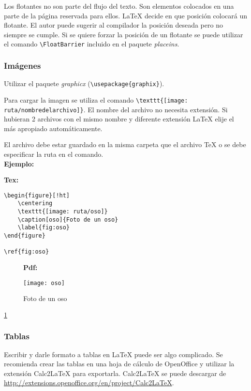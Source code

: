 \documentclass[12pt, a4paper,twoside]{article} %
\begin{document}
Los flotantes no son parte del flujo del texto. Son elementos colocados en una parte de la página reservada para ellos. LaTeX decide en que posición colocará un flotante. El autor puede sugerir al compilador la posición deseada pero no siempre se cumple. Si se quiere forzar la posición de un flotante se puede utilizar el comando \lstinline&\FloatBarrier& incluido en el paquete \emph{placeins}.

\subsubsection{Imágenes}

Utilizar el paquete \emph{graphicx} (\lstinline$\usepackage{graphix}$).

Para cargar la imagen se utiliza el comando \lstinline$\texttt{[image: ruta/nombredelarchivo]}$. El nombre del
archivo no necesita extensión. Si hubieran 2 archivos con el mismo nombre y diferente extensión LaTeX elije el más apropiado automáticamente. 

El archivo debe estar guardado en la misma carpeta que el archivo TeX o se debe especificar la ruta en el comando.\\

\noindent\textbf{Ejemplo:}

\textbf{Tex:}

\begin{lstlisting}
\begin{figure}[!ht]
    \centering
    \texttt{[image: ruta/oso]}
    \caption[oso]{Foto de un oso}
    \label{fig:oso}
\end{figure}

\ref{fig:oso}
\end{lstlisting}

\begin{figure}[!ht]
\textbf{Pdf:}

    \centering
    \texttt{[image: oso]}
    \caption[oso]{Foto de un oso}
    \label{fig:oso}
\end{figure}
\FloatBarrier

\ref{fig:oso}

\subsubsection{Tablas}

Escribir y darle formato a tablas en LaTeX puede ser algo complicado. Se recomienda crear las tablas en una hoja de cálculo de OpenOffice y utilizar la extensión Calc2LaTeX para exportarla. Calc2LaTeX se puede descargar de \url{http://extensions.openoffice.org/en/project/Calc2LaTeX}.\\
\end{document}

